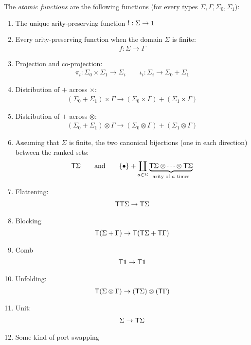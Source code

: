 \begin{definition}\label{def:atomic-functions} The \emph{atomic functions} are the following functions (for every types $\Sigma,\Gamma,\Sigma_0,\Sigma_1$): 
\begin{enumerate}
    \item The unique arity-preserving function $! : \Sigma \to \mathbf{1}$
    \item Every arity-preserving function when the domain $\Sigma$ is finite:
    \begin{align*}
        f : \Sigma \to \Gamma
    \end{align*}
    \item Projection and co-projection:
    \begin{align*}
        \pi_i : \Sigma_0 \times \Sigma_1 \to \Sigma_i \qquad \iota_i : \Sigma_i \to \Sigma_0 + \Sigma_1
    \end{align*}
    \item Distribution of $+$ across $\times$:
\begin{align*}
    (\Sigma_0 + \Sigma_1 ) \times \Gamma \to (\Sigma_0 \times \Gamma) + (\Sigma_1 \times \Gamma)
\end{align*}
\item Distribution of $+$ across $\otimes$:
\begin{align*}
    (\Sigma_0 + \Sigma_1 ) \otimes \Gamma \to (\Sigma_0 \otimes \Gamma) + (\Sigma_1 \otimes \Gamma)
\end{align*}
\item Assuming that $\Sigma$ is finite, the two canonical bijections (one in each direction) between the ranked sets:
 \begin{align*}
    \mathsf T \Sigma \qquad \text{and} \qquad    \{\bullet\} + \coprod_{a \in \Sigma} \underbrace{\mathsf T \Sigma \otimes \cdots \otimes \mathsf T \Sigma}_{\text{arity of $a$ times}}
\end{align*}
\item Flattening:
\begin{align*}
    \mathsf T \mathsf T \Sigma \to \mathsf T \Sigma
\end{align*}
\item Blocking
    \begin{align*}
        \mathsf T (\Sigma + \Gamma) \to \mathsf T (\mathsf T \Sigma + \mathsf T \Gamma)
    \end{align*}
    \item Comb
    \begin{align*}
        \mathsf T \mathbf{1} \to \mathsf T \mathbf{1}
    \end{align*}
    \item Unfolding: 
\begin{align*}
    \mathsf T (\Sigma \otimes \Gamma) \to (\mathsf T \Sigma) \otimes (\mathsf T \Gamma)
\end{align*}
    \item Unit:
\begin{align*}
    \Sigma  \to \mathsf T \Sigma
\end{align*}

\item Some kind of port swapping
\end{enumerate}
\end{definition}



